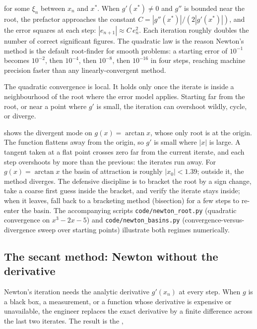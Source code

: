 for some $\xi_{n}$ between $x_{n}$ and $x^{*}$. When $g'(x^{*}) \neq
0$ and $g''$ is bounded near the root, the prefactor approaches the
constant $C = |g''(x^{*})| / (2 |g'(x^{*})|)$, and the error squares
at each step: $|e_{n+1}| \approx C \, e_{n}^{2}$. Each iteration
roughly doubles the number of correct significant figures. The
quadratic law is the reason Newton's method is the default
root-finder for smooth problems: a starting error of $10^{-1}$
becomes $10^{-2}$, then $10^{-4}$, then $10^{-8}$, then $10^{-16}$
in four steps, reaching machine precision faster than any
linearly-convergent method.

The quadratic convergence is local. It holds only once the iterate
is inside a neighbourhood of the root where the error model
applies. Starting far from the root, or near a point where $g'$ is
small, the iteration can overshoot wildly, cycle, or diverge.



 shows the divergent mode on
$g(x) = \arctan x$, whose only root is at the origin. The function
flattens away from the origin, so $g'$ is small where $|x|$ is
large. A tangent taken at a flat point crosses zero far from the
current iterate, and each step overshoots by more than the
previous: the iterates run away. For $g(x) = \arctan x$ the basin
of attraction is roughly $|x_{0}| < 1.39$; outside it, the method
diverges. The defensive discipline is to bracket the root by a sign
change, take a coarse first guess inside the bracket, and verify
the iterate stays inside; when it leaves, fall back to a bracketing
method (bisection) for a few steps to re-enter the basin. The
accompanying scripts \texttt{code/newton\_root.py} (quadratic
convergence on $x^{3} - 2x - 5$) and \texttt{code/newton\_basins.py}
(convergence-versus-divergence sweep over starting points)
illustrate both regimes numerically.

\subsection{The secant method: Newton without the derivative}

Newton's iteration needs the analytic derivative $g'(x_{n})$ at
every step. When $g$ is a black box, a measurement, or a function
whose derivative is expensive or unavailable, the engineer replaces
the exact derivative by a finite difference across the last two
iterates. The result is the ,

